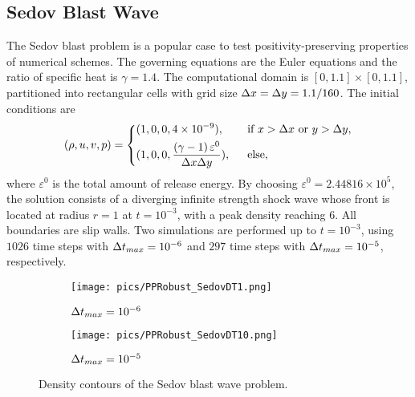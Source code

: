 \subsection{Sedov Blast Wave}

The Sedov blast problem \cite{zhang2012positivity,vilar2016positivity} is a popular case to test positivity-preserving properties of 
numerical schemes. 
The governing equations are the Euler equations and the ratio of specific heat is $\gamma = 1.4$. The computational domain is $[0,1.1]\times[0,1.1]$, partitioned into rectangular cells with grid size $\mathrm\Delta x = \mathrm\Delta y = 1.1/160$. The initial conditions are 
\begin{equation}
    (\rho,u,v,p) = \begin{dcases}
    	(1,0,0,4\times 10 ^{-9}),\ \ & \text{if } x > \inc x \ \mathrm{or} \ y > \inc y, \\
    	(1,0,0,\dfrac{\left(\gamma-1\right)\varepsilon^0}{\inc x\inc y}),\ \ & \text{else},\\
    \end{dcases}
\end{equation}
where $\varepsilon^0$ is the total amount of release energy. By choosing $\varepsilon^0= 2.44816\times 10^5$, the solution consists of a diverging infinite strength shock wave whose front is located at radius $r=1$ at $t=10^{-3}$, with a peak density reaching $6$.
All boundaries are slip walls.
Two simulations are performed up to $t=10^{-3}$, using $1026$ time steps with $\mathrm\Delta t_{max} = 10^{-6}$ and  $297$ time steps with $\mathrm\Delta t_{max} = 10^{-5}$, respectively.


\begin{figure}[htbp]
    \centering
    \begin{subfigure}{0.5\textwidth}
        \texttt{[image: pics/PPRobust\_SedovDT1.png]}
        \caption[]{$\mathrm\Delta t_{max}=10^{-6}$}
    \end{subfigure}\hfill
    \begin{subfigure}{0.5\textwidth}
        \texttt{[image: pics/PPRobust\_SedovDT10.png]}
        \caption[]{$\mathrm\Delta t_{max}=10^{-5}$}
    \end{subfigure}
    \caption{Density contours of the Sedov blast wave problem.}
    \label{fig:sedov}
\end{figure}

